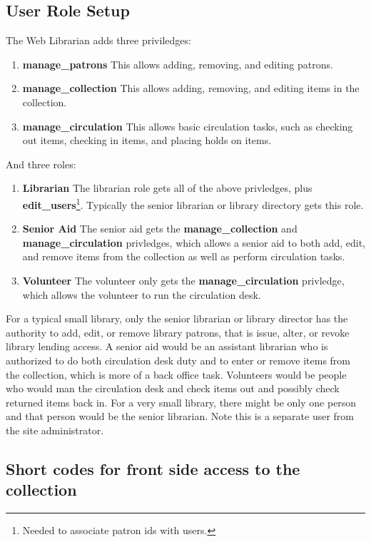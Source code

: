 \documentclass[letterpaper,twoside]{article}
\begin{document}
\subsection{User Role Setup}

The Web Librarian adds three priviledges:

\begin{enumerate}
\item \textbf{manage\_patrons} This allows adding, removing, and editing
patrons.
\item \textbf{manage\_collection} This allows adding, removing, and
editing items in the collection.
\item \textbf{manage\_circulation} This allows basic circulation tasks,
such as checking out items, checking in items, and placing holds on items.
\end{enumerate}

And three roles:
\begin{enumerate}
\item \textbf{Librarian} The librarian role gets all of the above
privledges, plus \textbf{edit\_users}\footnote{Needed to associate
patron ids with users.}. Typically the senior librarian or library
directory gets this role.
\item \textbf{Senior Aid} The senior aid gets the
\textbf{manage\_collection} and \textbf{manage\_circulation} privledges,
which allows a senior aid to both add, edit, and remove items from the
collection as well as perform circulation tasks.
\item \textbf{Volunteer} The volunteer only gets the
\textbf{manage\_circulation} privledge, which allows the volunteer to
run the circulation desk.
\end{enumerate}

For a typical small library, only the senior librarian or library
director has the authority to add, edit, or remove library
patrons, that is issue, alter, or revoke library lending access. A
senior aid would be an assistant librarian who is authorized to do both
circulation desk duty and to enter or remove items from the collection,
which is more of a back office task.  Volunteers would be people who
would man the circulation desk and check items out and possibly check returned
items back in.  For a very small library, there might be only one person
and that person would be the senior librarian.  Note this is a separate
user from the site administrator.

\subsection{Short codes for front side access to the collection}
\end{document}
